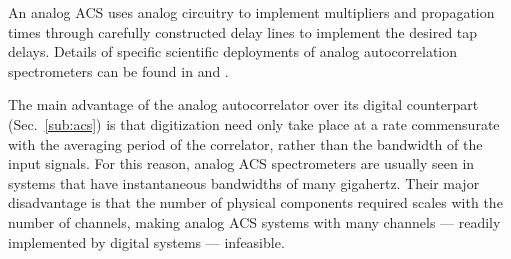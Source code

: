 \documentclass{ws-rv961x669}
\begin{document}


An analog ACS uses analog circuitry to implement multipliers and propagation times through carefully constructed delay lines to implement the desired tap delays. 
Details of specific scientific deployments of analog autocorrelation spectrometers can be found in \cite{Erickson2007} and \cite{Harris1998}.

The main advantage of the analog autocorrelator over its digital counterpart (Sec.~\ref{sub:acs}) is that digitization need only take place at a rate commensurate with the averaging period of the correlator, rather than the bandwidth of the input signals. For this reason, analog ACS spectrometers are usually seen in systems that have instantaneous bandwidths of many gigahertz. Their major disadvantage is that the number of physical components required scales with the number of channels, making analog ACS systems with many channels --- readily implemented by digital systems ---  infeasible.



\end{document}
